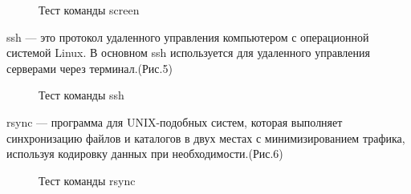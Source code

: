 \documentclass[a4paper,14pt]{extarticle}
\begin{document}
\begin{figure}[h]
\caption{Тест команды screen}
\label{fig:image}
\end{figure}

ssh — это протокол удаленного управления компьютером с операционной системой Linux. В основном ssh используется для удаленного управления серверами через терминал.(Рис.5)

\begin{figure}[h]
\caption{Тест команды ssh}
\label{fig:image}
\end{figure}


rsync — программа для UNIX-подобных систем, которая выполняет синхронизацию файлов и каталогов в двух местах с минимизированием трафика, используя кодировку данных при необходимости.(Рис.6)

\begin{figure}[h]
\caption{Тест команды rsync}
\label{fig:image}
\end{figure}
\end{document}
